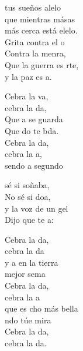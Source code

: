 \documentclass[12pt]{article}
\begin{document}
\begin{multicols*}{2}
\begin{cancion}
	tus sueños alelo\\
	que mientras másas\\
	más cerca está elelo.\\
	Grita contra el o\\
	Contra la menra,\\
	Que la guerra es rte,\\
	y la paz es a.\\
	\begin{chorus}%
	Cebra la va, \\
	cebra la da,\\
	Que a se guarda\\
	Que do te bda.\\
	Cebra la da, \\
	cebra la a,\\
	sendo a segundo  \\
	\end{chorus}%
	 sé si soñaba,\\
	No sé si doa, \\
	y la voz de un gel\\
	Dijo que te a:\\
	\begin{chorus}%
	Cebra la da, \\
	cebra la da\\
	y a en la tierra\\
	 mejor sema\\
	Cebra la da, \\
	cebra la a\\
	que es cho más bella \\
	ndo túe mira\\
	Cebra la da,\\
	cebra la da.\\
	\end{chorus}%
\end{cancion}%


\end{multicols*}
\end{document}
